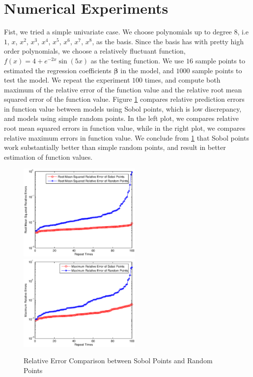 \documentclass[preprint,12pt]{elsarticle}
\begin{document}
\section{Numerical Experiments}
Fist, we tried a simple univariate case. We choose polynomials up to
degree $8$, i.e $1$, $x$, $x^2$, $x^3$, $x^4$, $x^5$, $x^6$, $x^7$,
$x^8$, as the basis. Since the basis has with pretty high order
polynomials, we choose a relatively fluctuant function,
$f(x)=4+e^{-2x}\sin(5x)$ as the testing function. We use $16$ sample
points to estimated the regression coefficients $\boldsymbol{\beta}$
in the model, and $1000$ sample points to test the model. We repeat
the experiment $100$ times, and compute both maximum of the relative
error of the function value and the relative root mean squared error
of the function value. Figure \ref{fig:unierror} compares relative
prediction errors in function value between models using Sobol
points, which is low discrepancy, and models using simple random
points. In the left plot, we compares relative root mean squared
errors in function value, while in the right plot, we compares
relative maximum errors in function value. We conclude from
\ref{fig:unierror} that Sobol points work substantially better than
simple random points, and result in better estimation of function
values.

\begin{figure}[htpb]
\begin{center}
\includegraphics[width=6cm]{unilognormerror.eps}
\includegraphics[width=6cm]{unilogsuperror.eps}
\caption{\label{fig:unierror} Relative Error Comparison between
Sobol Points and Random Points}
\end{center}
\end{figure}
\end{document}
